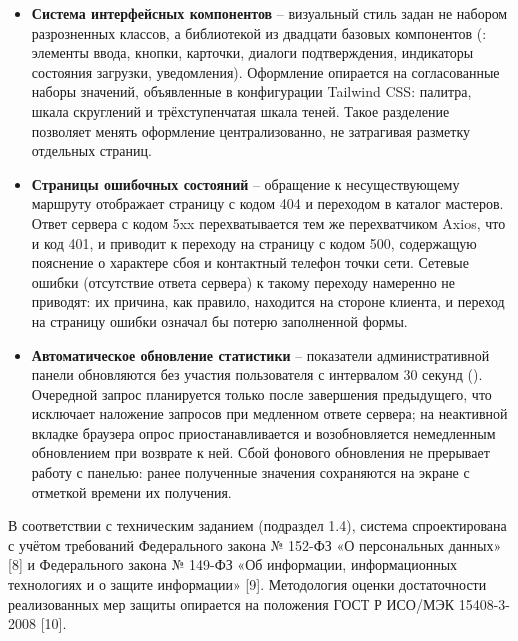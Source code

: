 \begin{itemize}
        авторитетом остаётся сервер, а клиентская половина лишь заменяет
        ответ с кодом 422 немедленной подсветкой поля.
  \item \textbf{Система интерфейсных компонентов} -- визуальный стиль
        задан не набором разрозненных классов, а библиотекой из двадцати
        базовых компонентов (: элементы ввода,
        кнопки, карточки, диалоги подтверждения, индикаторы состояния
        загрузки, уведомления). Оформление опирается на согласованные
        наборы значений, объявленные в конфигурации Tailwind CSS:
        палитра, шкала скруглений и трёхступенчатая шкала теней. Такое
        разделение позволяет менять оформление централизованно, не
        затрагивая разметку отдельных страниц.
  \item \textbf{Страницы ошибочных состояний} -- обращение к
        несуществующему маршруту отображает страницу с кодом 404 и
        переходом в каталог мастеров. Ответ сервера с кодом 5xx
        перехватывается тем же перехватчиком Axios, что и код 401, и
        приводит к переходу на страницу с кодом 500, содержащую
        пояснение о характере сбоя и контактный телефон точки сети.
        Сетевые ошибки (отсутствие ответа сервера) к такому переходу
        намеренно не приводят: их причина, как правило, находится на
        стороне клиента, и переход на страницу ошибки означал бы потерю
        заполненной формы.
  \item \textbf{Автоматическое обновление статистики} -- показатели
        административной панели обновляются без участия пользователя с
        интервалом 30 секунд (). Очередной
        запрос планируется только после завершения предыдущего, что
        исключает наложение запросов при медленном ответе сервера; на
        неактивной вкладке браузера опрос приостанавливается и
        возобновляется немедленным обновлением при возврате к ней. Сбой
        фонового обновления не прерывает работу с панелью: ранее
        полученные значения сохраняются на экране с отметкой времени их
        получения.
\end{itemize}


В соответствии с техническим заданием (подраздел 1.4), система
спроектирована с учётом требований Федерального закона № 152-ФЗ «О
персональных данных» [8] и Федерального закона № 149-ФЗ «Об информации,
информационных технологиях и о защите информации» [9]. Методология оценки
достаточности реализованных мер защиты опирается на положения ГОСТ Р
ИСО/МЭК 15408-3-2008 [10].

